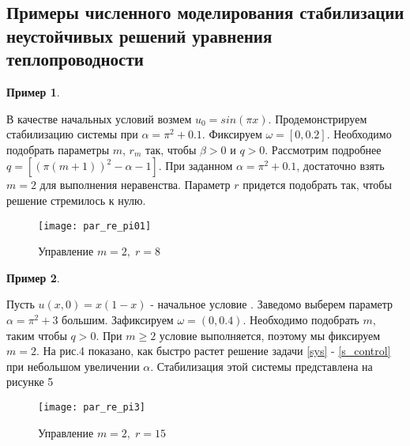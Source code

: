 \subsection{Примеры численного моделирования стабилизации неустойчивых
решений уравнения теплопроводности}

\vspace{1em}

\newtheorem{exmp_st}{Пример}

\begin{exmp_st}
\end{exmp_st}

В качестве начальных условий возмем $u_0 = sin(\pi x)$. Продемонстрируем 
стабилизацию системы при $\alpha = \pi^2 + 0.1$. Фиксируем $\omega = [0, 0.2]$. 
Необходимо подобрать параметры $m$, $r_m$ так, чтобы $\beta > 0$ и $q > 0$. 
Рассмотрим подробнее $q = [(\pi(m + 1))^2 - \alpha - 1]$. При заданном 
$\alpha = \pi^2 + 0.1$, достаточно взять $m = 2$ для выполнения неравенства. 
Параметр $r$ придется подобрать так, чтобы решение стремилось к нулю.


\begin{figure}[H]
    \centering
    \texttt{[image: par\_re\_pi01]}
    \caption{Управление $m = 2,\; r = 8$}
    \label{fig:test2}
\end{figure}

\begin{exmp_st}
\end{exmp_st}

Пусть $u(x, 0) = x(1 - x)$ - начальное условие . Заведомо выберем параметр 
$\alpha = \pi^2 + 3$ большим. Зафиксируем $\omega = (0, 0.4)$. 
Необходимо подобрать $m$, таким чтобы $q > 0$. При $m \ge 2$ условие выполняется, 
поэтому мы фиксируем $m = 2$. На рис.4 показано, как быстро растет решение 
задачи \eqref{sys} - \eqref{s_control} при небольшом увеличении $\alpha$. 
Стабилизация этой системы представлена на рисунке 5

\begin{figure}[H]
    \centering
    \texttt{[image: par\_re\_pi3]}
    \caption{Управление $m = 2,\; r = 15$}
    \label{fig:test2}
\end{figure}
